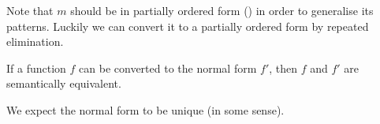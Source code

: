 Note that $m$ should be in partially ordered form () in
order to generalise its patterns. Luckily we can convert it to a partially
ordered form by repeated elimination.

\begin{lemma}
  If a function $f$ can be converted to the normal form $f'$, then $f$ and $f'$
  are semantically equivalent.
\end{lemma}

\begin{lemma}
  We expect the normal form to be unique (in some sense).
\end{lemma}





